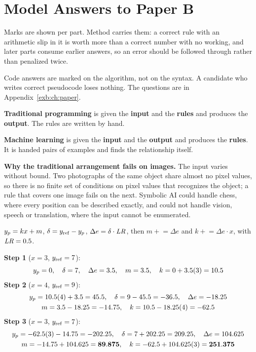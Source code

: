 
\renewcommand{\answerprefix}{ansb}

\chapter{Model Answers to Paper B}
\label{ansb:ch:answers}

Marks are shown per part. Method carries them: a correct rule with an arithmetic slip in it is worth
more than a correct number with no working, and later parts consume earlier answers, so an error
should be followed through rather than penalized twice.

Code answers are marked on the algorithm, not on the syntax. A candidate who writes correct
pseudocode loses nothing. The questions are in Appendix~\ref{exb:ch:paper}.


\textbf{Traditional programming} is given the \textbf{input} and the \textbf{rules} and produces the
\textbf{output}. The rules are written by hand.

\textbf{Machine learning} is given the \textbf{input} and the \textbf{output} and produces the
\textbf{rules}. It is handed pairs of examples and finds the relationship itself. 

\textbf{Why the traditional arrangement fails on images.} The input varies without bound. Two
photographs of the same object share almost no pixel values, so there is no finite set of
conditions on pixel values that recognizes the object; a rule that covers one image fails on the
next. Symbolic AI could handle chess, where every position can be described exactly, and could not
handle vision, speech or translation, where the input cannot be enumerated. 

$y_{p} = kx + m$, $\delta = y_{\mathrm{ref}} - y_{p}$, $\Delta e = \delta \cdot \mathit{LR}$, then
$m \mathrel{+}= \Delta e$ and $k \mathrel{+}= \Delta e \cdot x$, with $\mathit{LR} = 0.5$.

\textbf{Step 1} ($x = 3$, $y_{\mathrm{ref}} = 7$):
\[
  y_{p} = 0, \quad \delta = 7, \quad \Delta e = 3.5, \quad m = 3.5, \quad k = 0 + 3.5(3) = 10.5
\]
\textbf{Step 2} ($x = 4$, $y_{\mathrm{ref}} = 9$):
\begin{gather*}
  y_{p} = 10.5(4) + 3.5 = 45.5, \quad \delta = 9 - 45.5 = -36.5, \quad \Delta e = -18.25 \\
  m = 3.5 - 18.25 = -14.75, \quad k = 10.5 - 18.25(4) = -62.5
\end{gather*}
\textbf{Step 3} ($x = 3$, $y_{\mathrm{ref}} = 7$):
\begin{gather*}
  y_{p} = -62.5(3) - 14.75 = -202.25, \quad \delta = 7 + 202.25 = 209.25, \quad \Delta e = 104.625 \\
  m = -14.75 + 104.625 = \mathbf{89.875}, \quad k = -62.5 + 104.625(3) = \mathbf{251.375}
\end{gather*}

